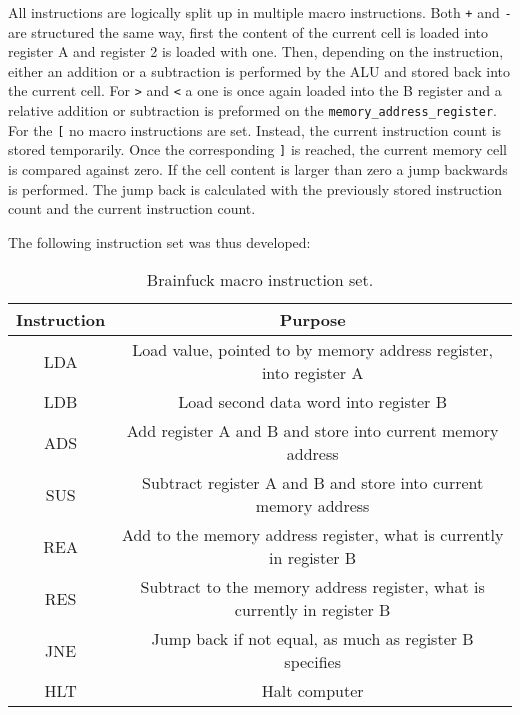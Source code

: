 All instructions are logically split up in multiple macro instructions. Both \texttt{+} and \texttt{-} are structured the same way, first the content of the current cell is loaded into register A and register 2 is loaded with one. Then, depending on the instruction, either an addition or a subtraction is performed by the ALU and stored back into the current cell. For \texttt{\textgreater} and \texttt{\textless} a one is once again loaded into the B register and a relative addition or subtraction is preformed on the \texttt{memory\_address\_register}. For the \texttt{{[}} no macro instructions are set. Instead, the current instruction count is stored temporarily. Once the corresponding \texttt{{]}} is reached, the current memory cell is compared against zero. If the cell content is larger than zero a jump backwards is performed. The jump back is calculated with the previously stored instruction count and the current instruction count.

The following instruction set was thus developed:
\begin{table}[]
    \begin{centering}
    \begin{tabular}{cc}
    Instruction & Purpose                                                                  \\ \hline
    LDA         & Load value, pointed to by memory address register, into register A       \\
    LDB         & Load second data word into register B                                    \\
    ADS         & Add register A and B and store into current memory address               \\
    SUS         & Subtract register A and B and store into current memory address          \\
    REA         & Add to the memory address register, what is currently in register B      \\
    RES         & Subtract to the memory address register, what is currently in register B \\
    JNE         & Jump back if not equal, as much as register B specifies                  \\
    HLT         & Halt computer                                                           
    \end{tabular}
\end{centering}
    \caption{Brainfuck macro instruction set.}
    \label{tab:brainfuck-macro-instructions}
    \end{table}

